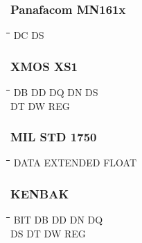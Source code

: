\subsubsection{Panafacom MN161x}
{\tt\begin{tabbing}
\hspace{3cm}\=\hspace{3cm}\=\hspace{3cm}\=\hspace{3cm}\=\kill
DC         \> DS \\
\end{tabbing}}

\subsubsection{XMOS XS1}
{\tt\begin{tabbing}
\hspace{3cm}\=\hspace{3cm}\=\hspace{3cm}\=\hspace{3cm}\=\kill
DB         \> DD          \> DQ          \> DN          \> DS \\
DT         \> DW          \> REG \\
\end{tabbing}}

\subsubsection{MIL STD 1750}
{\tt\begin{tabbing}
\hspace{3cm}\=\hspace{3cm}\=\hspace{3cm}\=\hspace{3cm}\=\kill
DATA       \> EXTENDED    \> FLOAT \\
\end{tabbing}}

\subsubsection{KENBAK}
{\tt\begin{tabbing}
\hspace{3cm}\=\hspace{3cm}\=\hspace{3cm}\=\hspace{3cm}\=\kill
BIT        \> DB          \> DD          \> DN          \> DQ \\
DS         \> DT          \> DW          \> REG \\
\end{tabbing}}
